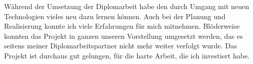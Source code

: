 Während der Umsetzung der Diplomarbeit habe den durch Umgang mit neuen Technologien vieles neu dazu lernen können. Auch bei der Planung und Realisierung konnte ich viele Erfahrungen für mich mitnehmen. Blöderweise konnten das Projekt in ganzen unseren Vorstellung umgesetzt werden, das es seitens meiner Diplomarbeitspartner nicht mehr weiter verfolgt wurde. Das Projekt ist durchaus gut gelungen, für die harte Arbeit, die ich investiert habe.